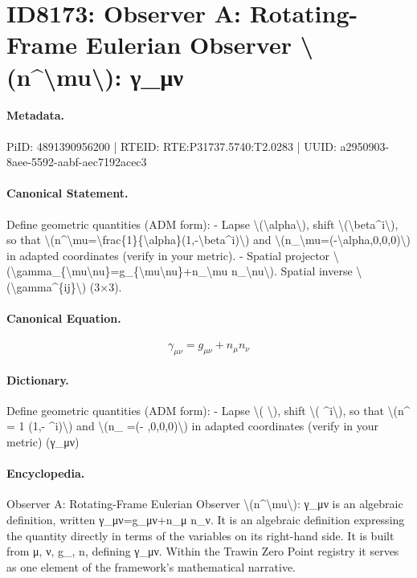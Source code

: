 \section*{ID8173: Observer A: Rotating-Frame Eulerian Observer \textbackslash{}(n\textasciicircum{}\textbackslash{}mu\textbackslash{}): γ\_μν}
\paragraph{Metadata.}
PiID: 4891390956200 | RTEID: RTE:P31737.5740:T2.0283 | UUID: a2950903-8aee-5592-aabf-aec7192acec3

\paragraph{Canonical Statement.}
Define geometric quantities (ADM form): - Lapse \textbackslash{}(\textbackslash{}alpha\textbackslash{}), shift \textbackslash{}(\textbackslash{}beta\textasciicircum{}i\textbackslash{}), so that \textbackslash{}(n\textasciicircum{}\textbackslash{}mu=\textbackslash{}frac\{1\}\{\textbackslash{}alpha\}(1,-\textbackslash{}beta\textasciicircum{}i)\textbackslash{}) and \textbackslash{}(n\_\textbackslash{}mu=(-\textbackslash{}alpha,0,0,0)\textbackslash{}) in adapted coordinates (verify in your metric). - Spatial projector \textbackslash{}(\textbackslash{}gamma\_\{\textbackslash{}mu\textbackslash{}nu\}=g\_\{\textbackslash{}mu\textbackslash{}nu\}+n\_\textbackslash{}mu n\_\textbackslash{}nu\textbackslash{}). Spatial inverse \textbackslash{}(\textbackslash{}gamma\textasciicircum{}\{ij\}\textbackslash{}) (3×3).

\paragraph{Canonical Equation.}
\[
\gamma_{\mu\nu}=g_{\mu\nu}+n_\mu n_\nu
\]

\paragraph{Dictionary.}
Define geometric quantities (ADM form): - Lapse \textbackslash{}( \textbackslash{}), shift \textbackslash{}( \textasciicircum{}i\textbackslash{}), so that \textbackslash{}(n\textasciicircum{} = 1 (1,- \textasciicircum{}i)\textbackslash{}) and \textbackslash{}(n\_ =(- ,0,0,0)\textbackslash{}) in adapted coordinates (verify in your metric) (γ\_μν)

\paragraph{Encyclopedia.}
Observer A: Rotating-Frame Eulerian Observer \textbackslash{}(n\textasciicircum{}\textbackslash{}mu\textbackslash{}): γ\_μν is an algebraic definition, written γ\_μν=g\_μν+n\_μ n\_ν. It is an algebraic definition expressing the quantity directly in terms of the variables on its right-hand side. It is built from μ, ν, g\_, n, defining γ\_μν. Within the Trawin Zero Point registry it serves as one element of the framework's mathematical narrative.
